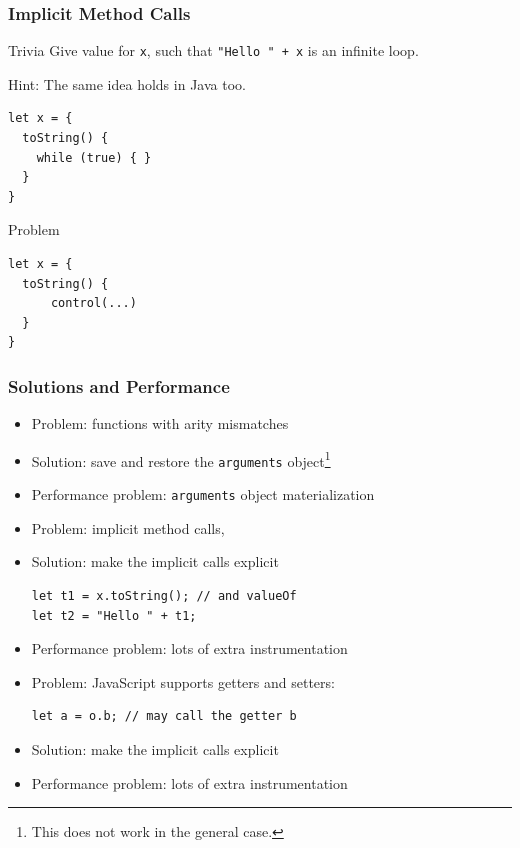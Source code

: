 \documentclass[8pt,pdf,handout]{beamer}
\begin{document}
\begin{frame}[fragile]
\frametitle{Implicit Method Calls}

\begin{block}{Trivia}
Give value for \lstinline|x|, such that \lstinline|"Hello " + x| is an infinite
loop.

\pause

Hint: The same idea holds in Java too.
\end{block}


\pause

\begin{lstlisting}
let x = {
  toString() {
    while (true) { }
  }
}
\end{lstlisting}

\begin{alertblock}{Problem}
\begin{lstlisting}
let x = {
  toString() {
      control(...)
  }
}
\end{lstlisting}
\end{alertblock}

\end{frame}

\begin{frame}[fragile]
\frametitle{Solutions and Performance}

\begin{itemize}

  \item Problem: functions with arity mismatches
  \item Solution: save and restore the \lstinline|arguments| object\footnote{This does not work in the general case.}
  \item Performance problem: \lstinline|arguments| object materialization
  \pause
  \item Problem: implicit method calls,
  \item Solution: make the implicit calls explicit
\begin{lstlisting}
let t1 = x.toString(); // and valueOf
let t2 = "Hello " + t1;
\end{lstlisting}
  \item Performance problem: lots of extra instrumentation
  \pause
  \item Problem: JavaScript supports getters and setters:
\begin{lstlisting}
let a = o.b; // may call the getter b
\end{lstlisting}
  \item Solution: make the implicit calls explicit
  \item Performance problem: lots of extra instrumentation

\end{itemize}

\end{frame}
\end{document}
